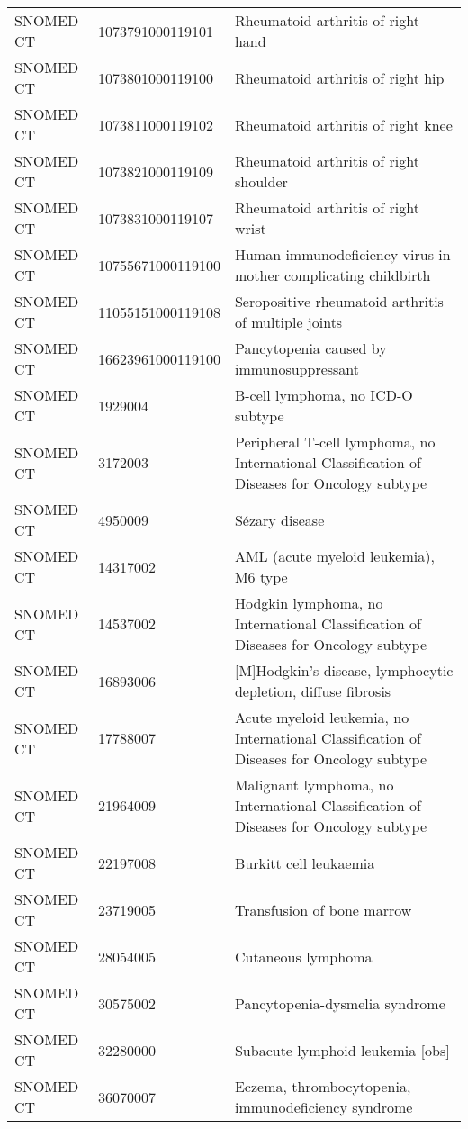\begin{table}[ht]
\begin{tabular}{lll}
  SNOMED CT & 1073791000119101 & Rheumatoid arthritis of right hand \\ 
  SNOMED CT & 1073801000119100 & Rheumatoid arthritis of right hip \\ 
  SNOMED CT & 1073811000119102 & Rheumatoid arthritis of right knee \\ 
  SNOMED CT & 1073821000119109 & Rheumatoid arthritis of right shoulder \\ 
  SNOMED CT & 1073831000119107 & Rheumatoid arthritis of right wrist \\ 
  SNOMED CT & 10755671000119100 & Human immunodeficiency virus in mother complicating childbirth \\ 
  SNOMED CT & 11055151000119108 & Seropositive rheumatoid arthritis of multiple joints \\ 
  SNOMED CT & 16623961000119100 & Pancytopenia caused by immunosuppressant \\ 
  SNOMED CT & 1929004 & B-cell lymphoma, no ICD-O subtype \\ 
  SNOMED CT & 3172003 & Peripheral T-cell lymphoma, no International Classification of Diseases for Oncology subtype \\ 
  SNOMED CT & 4950009 & Sézary disease \\ 
  SNOMED CT & 14317002 & AML (acute myeloid leukemia), M6 type \\ 
  SNOMED CT & 14537002 & Hodgkin lymphoma, no International Classification of Diseases for Oncology subtype \\ 
  SNOMED CT & 16893006 & [M]Hodgkin's disease, lymphocytic depletion, diffuse fibrosis \\ 
  SNOMED CT & 17788007 & Acute myeloid leukemia, no International Classification of Diseases for Oncology subtype \\ 
  SNOMED CT & 21964009 & Malignant lymphoma, no International Classification of Diseases for Oncology subtype \\ 
  SNOMED CT & 22197008 & Burkitt cell leukaemia \\ 
  SNOMED CT & 23719005 & Transfusion of bone marrow \\ 
  SNOMED CT & 28054005 & Cutaneous lymphoma \\ 
  SNOMED CT & 30575002 & Pancytopenia-dysmelia syndrome \\ 
  SNOMED CT & 32280000 & Subacute lymphoid leukemia [obs] \\ 
  SNOMED CT & 36070007 & Eczema, thrombocytopenia, immunodeficiency syndrome \\ 

\end{tabular}
\end{table}
